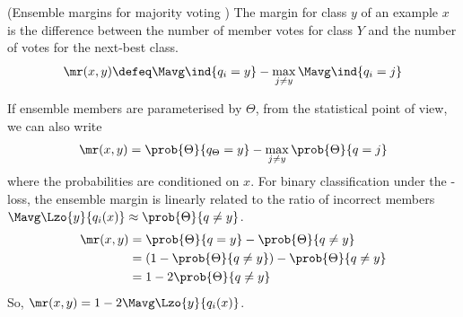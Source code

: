 \documentclass[
    a4paper, %
	fontsize=10pt, %
	twoside=false, %
]{kaobook}
\begin{document}
\begin{titlepage}
\begin{definition} (Ensemble margins for majority voting \cite{breiman})
The margin for class $y$ of an example $x$ is the difference between the number of member votes for class $Y$ and the number of votes for the next-best class.
	$$
\mr(x,y) \defeq \Mavg \ind{q_{i} = y} - \max_{j \neq y} \Mavg \ind{q_{i} = j}
$$
\label{def:ensemble-margin}
\end{definition}

If ensemble members are parameterised by $\Theta$, from the statistical point of view, we can also write
$$
\mr(x,y) = \prob{\Theta}{q_{\Theta} = y} - \max_{j \not=y} \prob{\Theta}{q=j}
$$
where the probabilities are conditioned on $x$. For binary classification under the \zeroone-loss, the ensemble margin is linearly related to the ratio of incorrect members $\Mavg \Lzo{y}{q_{i}(x)} \approx \prob{\Theta}{q \not= y}$.
$$
\begin{align*}
\mr(x,y) &= \prob{\Theta}{q=y}  - \prob{\Theta}{q \not= y} \\
&= (1 - \prob{\Theta}{q \not= y}) - \prob{\Theta}{q \not= y} \\
&= 1 - 2 \prob{\Theta}{q \not= y}
\end{align*}
$$
So, $\mr(x,y) = 1 - 2 \Mavg\Lzo{y}{q_{i}(x)}$.





\end{titlepage}
\end{document}
